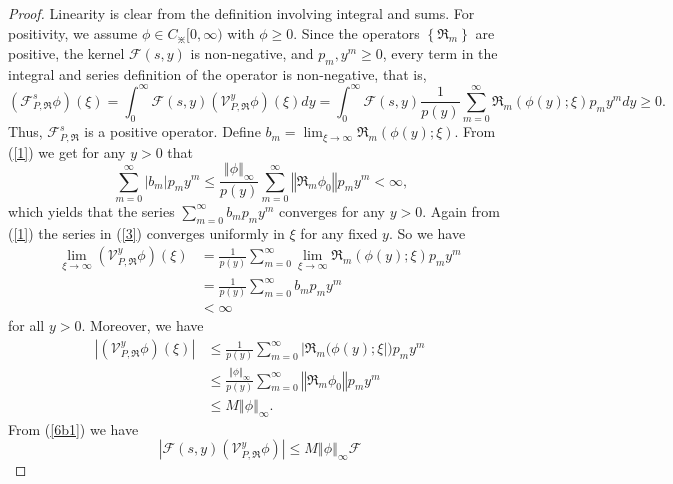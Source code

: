 \documentclass[10pt,a4paper]{amsart}
\begin{document}
\begin{proof}
Linearity is clear from the definition involving integral and sums. For
positivity, we assume $\phi \in C_{\divideontimes}[0,\infty)$ with $\phi \geq0$.
Since the operators $\left \{  \Re_{m}\right \}  $ are positive, the kernel
$\mathcal{F}(s,y)$ is non-negative, and $p_{m},y^{m}\geq0$, every term in the
integral and series definition of the operator is non-negative, that is,
\[
\left(  \mathcal{F}_{P,\Re}^{s}\phi \right)  (\xi)=\int_{0}^{\infty}%
\mathcal{F}(s,y)\left(  \mathcal{V}_{P,\Re}^{y}\phi \right)  \left(
\xi \right)  dy=\int_{0}^{\infty}\mathcal{F}(s,y)\frac{1}{p(y)}\sum
_{m=0}^{\infty}\Re_{m}(\phi(y);\xi)p_{m}y^{m}dy\geq0.
\]
Thus, $\mathcal{F}_{P,\Re}^{s}$ is a positive operator. Define $b_{m}%
=\displaystyle \lim_{\xi \rightarrow \infty}\Re_{m}(\phi(y);\xi)$. From (\ref{1})
we get for any $y>0$ that%
\[
\sum_{m=0}^{\infty}\left \vert b_{m}\right \vert p_{m}y^{m}\leq \frac{\left \Vert
\phi \right \Vert _{\infty}}{p(y)}\sum_{m=0}^{\infty}\left \Vert \Re_{m}\phi
_{0}\right \Vert p_{m}y^{m}<\infty \text{,}%
\]
which yields that the series $\displaystyle \sum_{m=0}^{\infty}b_{m}p_{m}y^{m}$
converges for any $y>0$. Again from (\ref{1}) the series in (\ref{3})
converges uniformly in $\xi$ for any fixed $y$. So we have
\begin{align}
\lim_{\xi \rightarrow \infty}\left(  \mathcal{V}_{P,\Re}^{y}\phi \right)  (\xi)
&  =\frac{1}{p(y)}\sum_{m=0}^{\infty}\lim_{\xi \rightarrow \infty}\Re_{m}%
(\phi(y);\xi)p_{m}y^{m}\nonumber \\
&  =\frac{1}{p(y)}\sum_{m=0}^{\infty}b_{m}p_{m}y^{m}\nonumber \\
&  <\infty \label{6b}%
\end{align}
for all $y>0$. Moreover, we have
\begin{align}
\left \vert \left(  \mathcal{V}_{P,\Re}^{y}\phi \right)  \left(  \xi \right)
\right \vert  &  \leq \frac{1}{p(y)}\sum_{m=0}^{\infty}\left \vert \Re_{m}%
(\phi(y);\xi \right \vert )p_{m}y^{m}\nonumber \\
&  \leq \frac{\left \Vert \phi \right \Vert _{\infty}}{p(y)}\sum_{m=0}^{\infty
}\left \Vert \Re_{m}\phi_{0}\right \Vert p_{m}y^{m}\nonumber \\
&  \leq M\left \Vert \phi \right \Vert _{\infty}.\label{6b1}%
\end{align}
From (\ref{6b1}) we have
\begin{equation}
\left \vert \mathcal{F}(s,y)\left(  \mathcal{V}_{P,\Re}^{y}\phi \right)
\right \vert \leq M\left \Vert \phi \right \Vert _{\infty}\mathcal{F}%

\end{equation}
\end{proof}
\end{document}
